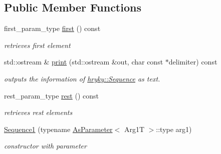 \subsection*{Public Member Functions}
\begin{DoxyCompactItemize}
\item 
\hypertarget{classhryky_1_1_sequence_a881ed830dc76f92d29fe8feea122339b}{first\-\_\-param\-\_\-type \hyperlink{classhryky_1_1_sequence_a881ed830dc76f92d29fe8feea122339b}{first} () const}\label{classhryky_1_1_sequence_a881ed830dc76f92d29fe8feea122339b}

\begin{DoxyCompactList}\small\item\em retrieves first element \end{DoxyCompactList}\item 
\hypertarget{classhryky_1_1_sequence_a8443de2eb918764c345a86b40dd888db}{std\-::ostream \& \hyperlink{classhryky_1_1_sequence_a8443de2eb918764c345a86b40dd888db}{print} (std\-::ostream \&out, char const $\ast$delimiter) const}\label{classhryky_1_1_sequence_a8443de2eb918764c345a86b40dd888db}

\begin{DoxyCompactList}\small\item\em outputs the information of \hyperlink{classhryky_1_1_sequence}{hryky\-::\-Sequence} as text. \end{DoxyCompactList}\item 
\hypertarget{classhryky_1_1_sequence_a11e616cd4cfe41751bbaa350fca3dcb1}{rest\-\_\-param\-\_\-type \hyperlink{classhryky_1_1_sequence_a11e616cd4cfe41751bbaa350fca3dcb1}{rest} () const}\label{classhryky_1_1_sequence_a11e616cd4cfe41751bbaa350fca3dcb1}

\begin{DoxyCompactList}\small\item\em retrieves rest elements \end{DoxyCompactList}\item 
\hypertarget{classhryky_1_1_sequence1_af6ec5e1dc6fc01498290565fd24d1e84}{\hyperlink{classhryky_1_1_sequence1_af6ec5e1dc6fc01498290565fd24d1e84}{Sequence1} (typename \hyperlink{classhryky_1_1_as_parameter}{As\-Parameter}$<$ Arg1\-T $>$\-::type arg1)}\label{classhryky_1_1_sequence1_af6ec5e1dc6fc01498290565fd24d1e84}

\begin{DoxyCompactList}\small\item\em constructor with parameter \end{DoxyCompactList}\end{DoxyCompactItemize}


